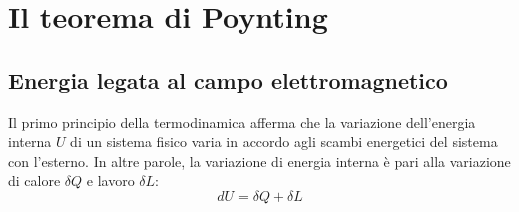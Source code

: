 \documentclass{book}
\begin{document}
\section{Il teorema di Poynting}
    \subsection{Energia legata al campo elettromagnetico}
        Il primo principio della termodinamica afferma che la variazione dell'energia interna $U$
        di un sistema fisico varia in accordo agli scambi energetici del sistema con l'esterno.
        In altre parole, la variazione di energia interna è pari alla variazione di calore $\delta Q$ e lavoro $\delta L$:
        \begin{equation}
            \label{eqn:primo_principio_termodinamica}
            d U = \delta Q+\delta L
        \end{equation}
\end{document}
